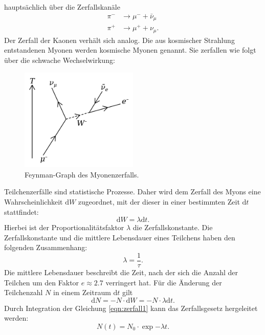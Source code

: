 \noindent
hauptsächlich über die Zerfallskanäle
\begin{align*}
\pi^{-} & \rightarrow \mu^{-} + \bar{\nu}_{\mu} \\
\pi^{+} & \rightarrow \mu^{+} + \nu_{\mu}.
\end{align*}
\noindent
Der Zerfall der Kaonen verhält sich analog. Die aus kosmischer Strahlung entstandenen
Myonen werden kosmische Myonen genannt.
Sie zerfallen wie folgt über die schwache Wechselwirkung:
\begin{figure}[H]
  \centering
  \includegraphics[width=0.5\textwidth]{pictures/Muon_Decay.png}
  \caption{Feynman-Graph des Myonenzerfalls.\cite{Myon-Wikipedia}}
  \label{zerfall}
\end{figure}
\noindent
Teilchenzerfälle sind statistische Prozesse. Daher wird dem Zerfall des Myons
eine Wahrscheinlichkeit $\text{d}W$  zugeordnet, mit der dieser in einer bestimmten Zeit $\text{d}t$
stattfindet:
\begin{equation*}
  \text{d}W = \lambda \text{d}t.
\end{equation*}
\noindent
Hierbei ist der Proportionalitätsfaktor $\lambda$ die Zerfallskonstante.
Die Zerfallskonstante und die mittlere Lebensdauer eines Teilchens haben den folgenden
Zusammenhang:
\begin{equation*}
  \lambda = \frac{1}{\tau}.
\end{equation*}
\noindent
Die mittlere Lebensdauer beschreibt die Zeit, nach der sich die Anzahl der Teilchen um
den Faktor $e \approx 2.7$ verringert hat.
Für die Änderung der Teilchenzahl $N$ in einem Zeitraum $\text{d}t$ gilt
\begin{equation}
  \text{d}N = - N \cdot \text{d}W = - N \cdot \lambda \text{d}t.
  \label{eqn:zerfall1}
\end{equation}
\noindent
Durch Integration der Gleichung \ref{eqn:zerfall1} kann das Zerfallsgesetz hergeleitet werden:
\begin{equation}
  N(t) = N_{0} \cdot \exp{- \lambda t}.
  \label{eqn:zerfallsgesetz}
\end{equation}
\noindent
